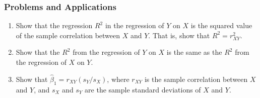 

\begin{frame}
\frametitle{Problems and Applications}
\begin{enumerate}
\item Show that the regression $R^2$ in the regression of $Y$ on $X$ is the squared value of the sample correlation between $X$ and $Y$. That is, show that $R^2=r^2_{XY}$.
\item Show that the $R^2$ from the regression of $Y$ on $X$ is the same as the $R^2$ from the regression of $X$ on $Y$.
\item Show that $\hat{\beta}_1=r_{XY}(s_{Y}/s_{X})$, where $r_{XY}$ is the sample correlation between $X$ and $Y$, and $s_X$ and $s_Y$ are the sample standard deviations of $X$ and $Y$.
\end{enumerate}
\end{frame}

